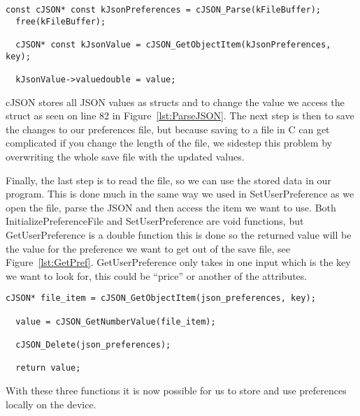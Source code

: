 \begin{lstlisting}[label={lst:ParseJSON}, caption={Parsing JSON.}]
  const cJSON* const kJsonPreferences = cJSON_Parse(kFileBuffer);
  free(kFileBuffer);

  cJSON* const kJsonValue = cJSON_GetObjectItem(kJsonPreferences, key);

  kJsonValue->valuedouble = value;
\end{lstlisting}

cJSON stores all JSON values as structs and to change the value we access the struct as seen on line 82 in
Figure~\ref{lst:ParseJSON}.
The next step is then to save the changes to our preferences file, but because saving to a file in C can get
complicated if you change the length of the file, we sidestep this problem by overwriting the whole save file with the
updated values.

Finally, the last step is to read the file, so we can use the stored data in our program.
This is done much in the same way we used in SetUserPreference as we open the file, parse the JSON and then access
the item we want to use.
Both InitializePreferenceFile and SetUserPreference are void functions, but GetUserPreference is a double function
this is done so the returned value will be the value for the preference we want to get out of the save file, see
Figure~\ref{lst:GetPref}.
GetUserPreference only takes in one input which is the key we want to look for, this could be ``price'' or another of
the attributes.

\begin{lstlisting}[label={lst:GetPref}, caption={Reading attribute value from preference file.}]
  cJSON* file_item = cJSON_GetObjectItem(json_preferences, key);

  value = cJSON_GetNumberValue(file_item);

  cJSON_Delete(json_preferences);

  return value;
\end{lstlisting}

With these three functions it is now possible for us to store and use preferences locally on the device.
